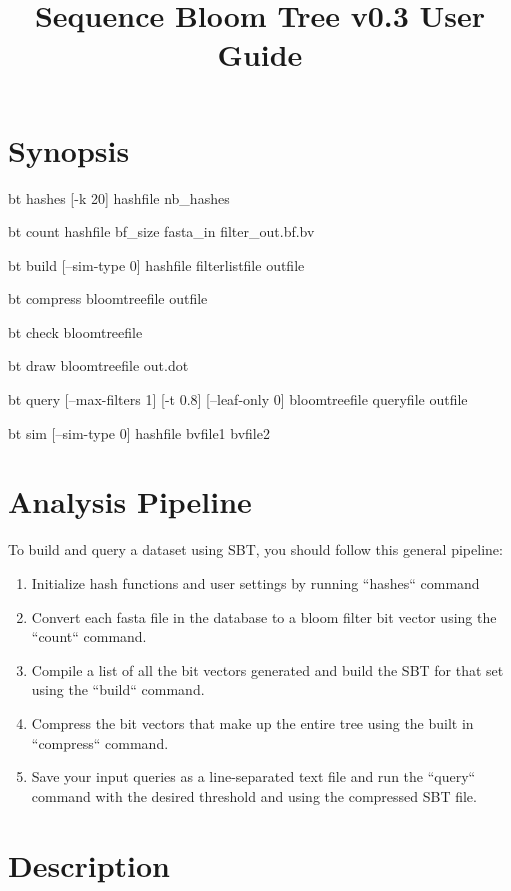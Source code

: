 \documentclass{article}
\title{Sequence Bloom Tree v0.3 User Guide}
\begin{document}
\maketitle
\newpage
\newpage
\section{Synopsis}

\hspace{5 mm}bt hashes [-k 20] hashfile nb\_hashes

bt count hashfile bf\_size fasta\_in filter\_out.bf.bv

bt build [--sim-type 0] hashfile filterlistfile outfile

bt compress bloomtreefile outfile

bt check bloomtreefile

bt draw bloomtreefile out.dot

bt query [--max-filters 1] [-t 0.8] [--leaf-only 0] bloomtreefile queryfile outfile


bt sim [--sim-type 0] hashfile bvfile1 bvfile2

\section{Analysis Pipeline}
To build and query a dataset using SBT, you should follow this general pipeline:
\begin{enumerate}
\item Initialize hash functions and user settings by running ``hashes`` command
\item Convert each fasta file in the database to a bloom filter bit vector using the  ``count`` command. 
\item Compile a list of all the bit vectors generated and build the SBT for that set using the ``build`` command.
\item Compress the bit vectors that make up the entire tree using the built in ``compress`` command.
\item Save your input queries as a line-separated text file and run the ``query`` command with the desired threshold and using the compressed SBT file.
\end{enumerate}

\section{Description}
\end{document}
